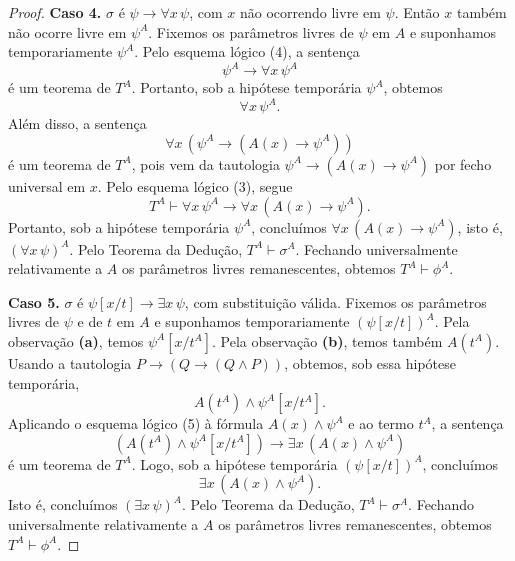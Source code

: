 \begin{proof}
    \smallskip
    \textbf{Caso 4.} $\sigma$ é $\psi\rightarrow \forall x\,\psi$, com $x$ não ocorrendo livre em $\psi$.
    Então $x$ também não ocorre livre em $\psi^A$.
    Fixemos os parâmetros livres de $\psi$ em $A$ e suponhamos temporariamente $\psi^A$.
    Pelo esquema lógico (4), a sentença
    \[
        \psi^A\rightarrow \forall x\,\psi^A
    \]
    é um teorema de $T^A$.
    Portanto, sob a hipótese temporária $\psi^A$, obtemos
    \[
        \forall x\,\psi^A.
    \]
    Além disso, a sentença
    \[
        \forall x\,(\psi^A\rightarrow (A(x)\rightarrow \psi^A))
    \]
    é um teorema de $T^A$, pois vem da tautologia $\psi^A\rightarrow (A(x)\rightarrow \psi^A)$ por fecho universal em $x$.
    Pelo esquema lógico (3), segue
    \[
        T^A\vdash \forall x\,\psi^A \rightarrow \forall x\,(A(x)\rightarrow \psi^A).
    \]
    Portanto, sob a hipótese temporária $\psi^A$, concluímos $\forall x\,(A(x)\rightarrow \psi^A)$, isto é, $(\forall x\,\psi)^A$.
    Pelo Teorema da Dedução, $T^A\vdash \sigma^A$.
    Fechando universalmente relativamente a $A$ os parâmetros livres remanescentes, obtemos $T^A\vdash \phi^A$.

    \smallskip
    \textbf{Caso 5.} $\sigma$ é $\psi[x/t]\rightarrow \exists x\,\psi$, com substituição válida.
    Fixemos os parâmetros livres de $\psi$ e de $t$ em $A$ e suponhamos temporariamente $(\psi[x/t])^A$.
    Pela observação \textbf{(a)}, temos $\psi^A[x/t^A]$.
    Pela observação \textbf{(b)}, temos também $A(t^A)$.
    Usando a tautologia $P\rightarrow (Q\rightarrow (Q\wedge P))$, obtemos, sob essa hipótese temporária,
    \[
        A(t^A)\wedge \psi^A[x/t^A].
    \]
    Aplicando o esquema lógico (5) à fórmula $A(x)\wedge \psi^A$ e ao termo $t^A$, a sentença
    \[
        (A(t^A)\wedge \psi^A[x/t^A])\rightarrow \exists x\,(A(x)\wedge \psi^A)
    \]
    é um teorema de $T^A$.
    Logo, sob a hipótese temporária $(\psi[x/t])^A$, concluímos
    \[
        \exists x\,(A(x)\wedge \psi^A).
    \]
    Isto é, concluímos $(\exists x\,\psi)^A$.
    Pelo Teorema da Dedução, $T^A\vdash \sigma^A$.
    Fechando universalmente relativamente a $A$ os parâmetros livres remanescentes, obtemos $T^A\vdash \phi^A$.


\end{proof}
